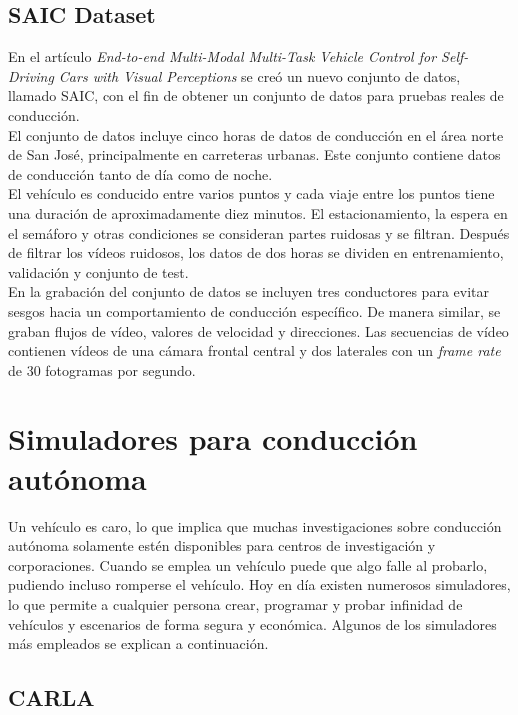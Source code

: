 \subsection{SAIC Dataset}

En el artículo \textit{End-to-end Multi-Modal Multi-Task Vehicle Control for Self-Driving Cars with Visual Perceptions} \cite{multi-modal} se creó un nuevo conjunto de datos, llamado SAIC, con el fin de obtener un conjunto de datos para pruebas reales de conducción.\\

El conjunto de datos incluye cinco horas de datos de conducción en el área norte de San José, principalmente en carreteras urbanas. Este conjunto contiene datos de conducción tanto de día como de noche. \\

El vehículo es conducido entre varios puntos y cada viaje entre los puntos tiene una duración de aproximadamente diez minutos. El estacionamiento, la espera en el semáforo y otras condiciones se consideran partes ruidosas y se filtran. Después de filtrar los vídeos ruidosos, los datos de dos horas se dividen en entrenamiento, validación y conjunto de test.\\

En la grabación del conjunto de datos se incluyen tres conductores para evitar sesgos hacia un comportamiento de conducción específico. De manera similar, se graban flujos de vídeo, valores de velocidad y direcciones. Las secuencias de vídeo contienen vídeos de una cámara frontal central y dos laterales con un \textit{frame rate} de 30 fotogramas por segundo.



\section{Simuladores para conducción autónoma}

Un vehículo es caro, lo que implica que muchas investigaciones sobre conducción autónoma solamente estén disponibles para centros de investigación y corporaciones. Cuando se emplea un vehículo puede que algo falle al probarlo, pudiendo incluso romperse el vehículo. Hoy en día existen numerosos simuladores, lo que permite a cualquier persona crear, programar y probar infinidad de vehículos y escenarios de forma segura y económica. Algunos de los simuladores más empleados se explican a continuación.

\subsection{CARLA}

